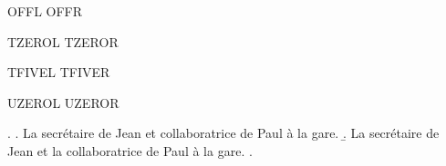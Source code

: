 {\GlossPhantomAlignOff
\noindent OFFL  OFFR
\par}

{\renewcommand\AltJdgTuck{0pt}
\noindent TZEROL  TZEROR\par}

{\renewcommand\AltJdgTuck{5pt}
\noindent TFIVEL  TFIVER\par}

{\renewcommand\AltJdgTuck{5pt}
\noindent UZEROL  UZEROR\par}

\ex. \a. La secrétaire de Jean et collaboratrice de Paul
          à la gare.
\b. La secrétaire de Jean et la collaboratrice de Paul
     à la gare.
\z.


